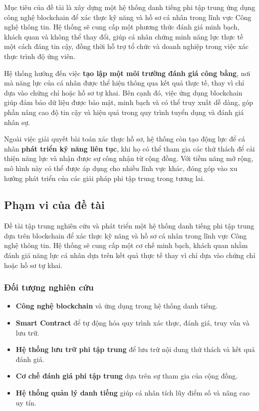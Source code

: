 \documentclass{article}[14pt]
\begin{document}
{    Mục tiêu của đề tài là xây dựng một hệ thống danh tiếng phi tập trung ứng dụng công nghệ blockchain để xác thực kỹ năng và hồ sơ cá nhân trong lĩnh vực Công nghệ thông tin. 
    Hệ thống sẽ cung cấp một phương thức đánh giá minh bạch, khách quan và không thể thay đổi, giúp cá nhân chứng minh năng lực thực tế một cách đáng tin cậy, 
    đồng thời hỗ trợ tổ chức và doanh nghiệp trong việc xác thực trình độ ứng viên.

    Hệ thống hướng đến việc \textbf{tạo lập một môi trường đánh giá công bằng}, nơi mà năng lực của cá nhân được thể hiện thông qua kết quả thực tế, 
    thay vì chỉ dựa vào chứng chỉ hoặc hồ sơ tự khai. Bên cạnh đó, việc ứng dụng blockchain giúp đảm bảo dữ liệu được bảo mật, 
    minh bạch và có thể truy xuất dễ dàng, góp phần nâng cao độ tin cậy và hiệu quả trong quy trình tuyển dụng và đánh giá nhân sự.

    Ngoài việc giải quyết bài toán xác thực hồ sơ, hệ thống còn tạo động lực để cá nhân \textbf{phát triển kỹ năng liên tục}, khi họ có thể tham gia các thử thách 
    để cải thiện năng lực và nhận được sự công nhận từ cộng đồng. Với tiềm năng mở rộng, mô hình này có thể được áp dụng cho nhiều lĩnh vực khác, 
    đóng góp vào xu hướng phát triển của các giải pháp phi tập trung trong tương lai.
    
    \subsection{Phạm vi của đề tài}
    
    Đề tài tập trung nghiên cứu và phát triển một hệ thống danh tiếng phi tập trung dựa trên blockchain để xác thực kỹ năng và hồ sơ cá nhân trong lĩnh vực Công nghệ thông tin. 
    Hệ thống sẽ cung cấp một cơ chế minh bạch, khách quan nhằm đánh giá năng lực cá nhân dựa trên kết quả thực tế thay vì chỉ dựa vào chứng chỉ hoặc hồ sơ tự khai.

    \subsubsection{Đối tượng nghiên cứu}
    \begin{itemize}
        \item \textbf{Công nghệ blockchain} và ứng dụng trong hệ thống danh tiếng.
        \item \textbf{Smart Contract} để tự động hóa quy trình xác thực, đánh giá, truy vấn và lưu trữ.
        \item \textbf{Hệ thống lưu trữ phi tập trung} để lưu trữ nội dung thử thách và kết quả đánh giá.
        \item \textbf{Cơ chế đánh giá phi tập trung} dựa trên sự tham gia của cộng đồng.
        \item \textbf{Hệ thống quản lý danh tiếng} giúp cá nhân tích lũy điểm số và nâng cao uy tín.
    \end{itemize}

}
\end{document}

